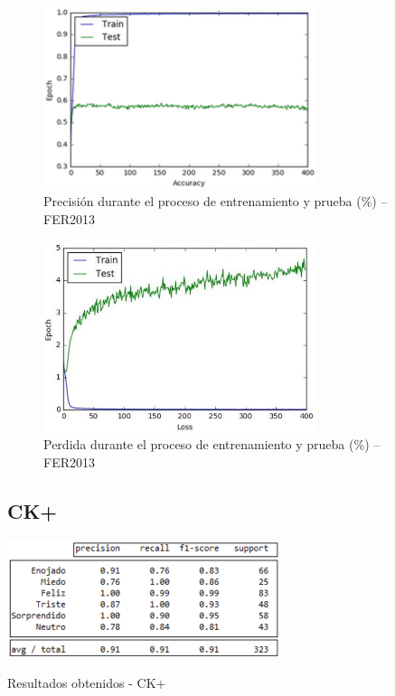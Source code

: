 \begin{figure}[H]
		\centering
		\includegraphics[width=80mm]{./Imagenes/precision_fer.png}
		\caption{Precisión durante el proceso de entrenamiento y prueba (\%) – FER2013}
		\label{fig:precision_fer}
\end{figure}

\begin{figure}[H]
		\centering
		\includegraphics[width=80mm]{./Imagenes/perdida_fer.png}
		\caption{Perdida durante el proceso de entrenamiento y prueba (\%) – FER2013}
		\label{fig:perdida_fer}
\end{figure}

\subsection{CK+}

\begin{table}[H]
    \centering
    \includegraphics[width=80mm]{./Imagenes/tabla_resultados_ck+.png} 
    \caption{Resultados obtenidos - CK+}
    \label{tab:tabla_resultados_ck+}
\end{table}

